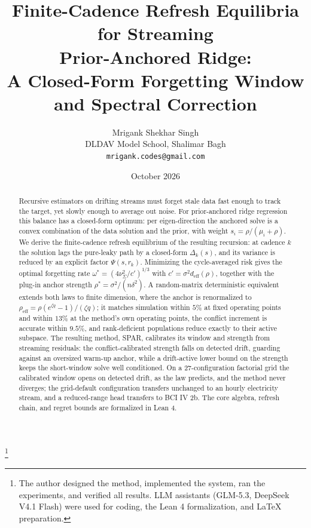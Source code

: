 \documentclass[10pt]{article}
\title{Finite-Cadence Refresh Equilibria for Streaming\\
Prior-Anchored Ridge:\\
A Closed-Form Forgetting Window and Spectral Correction}
\author{Mrigank Shekhar Singh\\
DLDAV Model School, Shalimar Bagh\\
\texttt{mrigank.codes@gmail.com}
}
\date{October 2026}
\begin{document}
\raggedbottom
\maketitle
\begingroup
\renewcommand\thefootnote{}\footnote{The author designed the method, implemented
the system, ran the experiments, and verified all results. LLM assistants
(GLM-5.3, DeepSeek V4.1 Flash) were used for coding, the Lean 4 formalization,
and \LaTeX{} preparation.}
\endgroup

\begin{abstract}
Recursive estimators on drifting streams must forget stale data fast enough to track the target, yet slowly enough to average out noise.
For prior-anchored ridge regression this balance has a closed-form optimum: per eigen-direction the anchored solve is a convex combination of the data solution and the prior, with weight $s_i=\rho/(\mu_i+\rho)$.
We derive the finite-cadence refresh equilibrium of the resulting recursion: at cadence $k$ the solution lags the pure-leaky path by a closed-form $\Delta_k(s)$, and its variance is reduced by an explicit factor $\Psi(s,r_k)$.
Minimizing the cycle-averaged risk gives the optimal forgetting rate $\omega^*=(4\nu^2_\Sigma/c')^{1/3}$ with $c'=\sigma^2d_{\mathrm{eff}}(\rho)$, together with the plug-in anchor strength $\rho^*=\sigma^2/(n\delta^2)$.
A random-matrix deterministic equivalent extends both laws to finite dimension, where the anchor is renormalized to $\rho_{\mathrm{eff}}=\rho(e^{\zeta q}-1)/(\zeta q)$; it matches simulation within $5\%$ at fixed operating points and within $13\%$ at the method's own operating points, the conflict increment is accurate within $9.5\%$, and rank-deficient populations reduce exactly to their active subspace.
The resulting method, SPAR, calibrates its window and strength from streaming residuals: the conflict-calibrated strength falls on detected drift, guarding against an oversized warm-up anchor, while a drift-active lower bound on the strength keeps the short-window solve well conditioned.
On a 27-configuration factorial grid the calibrated window opens on detected drift, as the law predicts, and the method never diverges; the grid-default configuration transfers unchanged to an hourly electricity stream, and a reduced-range head transfers to BCI IV 2b. The core algebra, refresh chain, and regret bounds are formalized in Lean 4.
\end{abstract}
\end{document}
